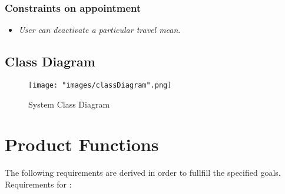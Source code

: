 \subsubsection{Constraints on appointment} \label{subsubsect:constronappoint}
\begin{itemize}
\item \textit{User can deactivate a particular travel mean}.
\end{itemize}

\subsection{Class Diagram}
\begin{figure}[H]
\begin{center}
\texttt{[image: "images/classDiagram".png]}
\caption{System Class Diagram}
\end{center}
\end{figure}

\section{Product Functions}

The following requirements are derived in order to fullfill the specified goals.\\

Requirements for :

